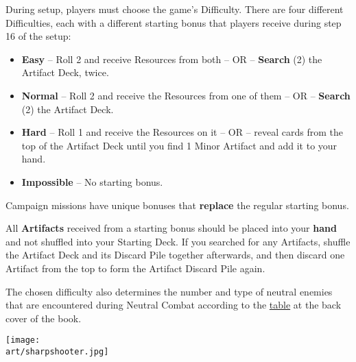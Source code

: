 
\begin{multicols}{2}

During setup, players must choose the game's \hypertarget{Difficulty}{Difficulty}.
There are four different Difficulties, each with a different starting bonus that players receive during step 16 of the setup:
\begin{itemize}
  \item \textbf{Easy} – Roll 2  and receive Resources from both – OR – \textbf{Search} (2) the Artifact Deck, twice.
  \item \textbf{Normal} – Roll 2  and receive the Resources from one of them – OR – \textbf{Search} (2) the Artifact Deck.
  \item \textbf{Hard} – Roll 1  and receive the Resources on it – OR – reveal cards from the top of the Artifact Deck until you find 1 Minor Artifact and add it to your hand.
  \item \textbf{Impossible} – No starting bonus.
\end{itemize}

\columnbreak

Campaign missions have unique bonuses that \textbf{replace} the regular starting bonus.

All \textbf{Artifacts} received from a starting bonus should be placed into your \textbf{hand} and not shuffled into your Starting Deck.
If you searched for any Artifacts, shuffle the Artifact Deck and its Discard Pile together afterwards, and then discard one Artifact from the top to form the Artifact Discard Pile again.\par
The chosen difficulty also determines the number and type of neutral enemies that are encountered during Neutral Combat according to the \hyperlink{Difficulty Table}{table} at the back cover of the book.

\end{multicols}

\texttt{[image: \\art/sharpshooter.jpg]}

\clearpage

